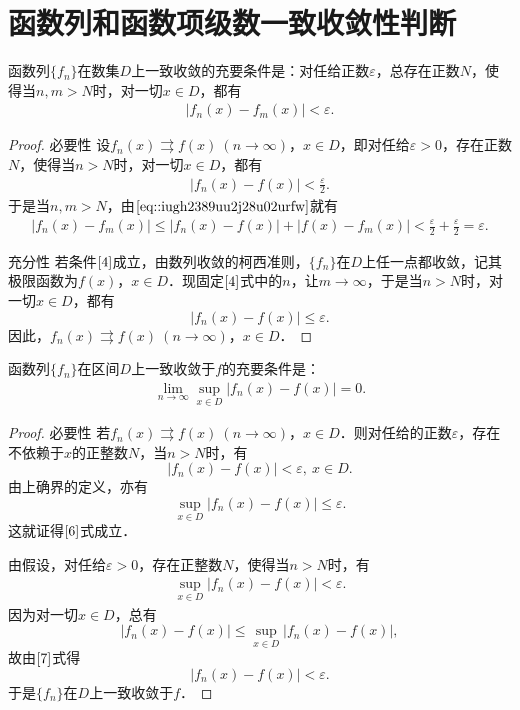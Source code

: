\documentclass[../../main.tex]{subfiles}%
\begin{document}
\section{函数列和函数项级数一致收敛性判断}

\begin{theorem}[函数列一致收敛的柯西准则]\label{theorem:函数列一致收敛的柯西准则}
函数列\(\{f_n\}\)在数集\(D\)上一致收敛的充要条件是：对任给正数\(\varepsilon\)，总存在正数\(N\)，使得当\(n, m > N\)时，对一切\(x \in D\)，都有
\begin{align}
|f_n(x) - f_m(x)| < \varepsilon.\label{4}
\end{align}
\end{theorem}
\begin{proof}

{\heiti 必要性} 设\(f_n(x) \rightrightarrows f(x) \ (n \to \infty)\)，\(x \in D\)，即对任给\(\varepsilon > 0\)，存在正数\(N\)，使得当\(n > N\)时，对一切\(x \in D\)，都有
\begin{align}
|f_n(x) - f(x)| < \frac{\varepsilon}{2}. \label{eq::iugh2389uu2j28u02urfw}
\end{align}
于是当\(n, m > N\)，由\(\eqref{eq::iugh2389uu2j28u02urfw}\)就有
\begin{align*}
|f_n(x) - f_m(x)| \leqslant |f_n(x) - f(x)| + |f(x) - f_m(x)| < \frac{\varepsilon}{2} + \frac{\varepsilon}{2} = \varepsilon.
\end{align*}

{\heiti 充分性} 若条件\(\eqref{4}\)成立，由数列收敛的柯西准则，\(\{f_n\}\)在\(D\)上任一点都收敛，记其极限函数为\(f(x)\)，\(x \in D\)．现固定\(\eqref{4}\)式中的\(n\)，让\(m \to \infty\)，于是当\(n > N\)时，对一切\(x \in D\)，都有
\[
|f_n(x) - f(x)| \leqslant \varepsilon.
\]
因此，\(f_n(x) \rightrightarrows f(x) \ (n \to \infty)\)，\(x \in D\)．

\end{proof} 

\begin{theorem}
函数列\(\{f_n\}\)在区间\(D\)上一致收敛于\(f\)的充要条件是：
\begin{align}
\lim_{n \to \infty} \sup_{x \in D} |f_n(x) - f(x)| = 0. \label{6}
\end{align}
\end{theorem} 
\begin{proof}

{\heiti 必要性} 若\(f_n(x) \rightrightarrows f(x) \ (n \to \infty)\)，\(x \in D\)．则对任给的正数\(\varepsilon\)，存在不依赖于\(x\)的正整数\(N\)，当\(n > N\)时，有
\[
|f_n(x) - f(x)| < \varepsilon, \ x \in D.
\]
由上确界的定义，亦有
\[
\sup_{x \in D} |f_n(x) - f(x)| \leqslant \varepsilon.
\]
这就证得\(\eqref{6}\)式成立．

 由假设，对任给\(\varepsilon > 0\)，存在正整数\(N\)，使得当\(n > N\)时，有
\begin{align}
\sup_{x \in D} |f_n(x) - f(x)| < \varepsilon. \label{7}
\end{align}
因为对一切\(x \in D\)，总有
\[
|f_n(x) - f(x)| \leqslant \sup_{x \in D} |f_n(x) - f(x)|,
\]
故由\(\eqref{7}\)式得
\[
|f_n(x) - f(x)| < \varepsilon.
\]
于是\(\{f_n\}\)在\(D\)上一致收敛于\(f\)．

\end{proof}
\end{document}
